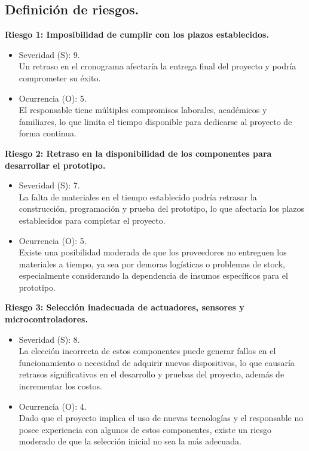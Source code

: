 \subsection{Definición de riesgos.}

\textbf{Riesgo 1: Imposibilidad de cumplir con los plazos establecidos.}
\begin{itemize}
	\item Severidad (S): 9.\\ Un retraso en el cronograma afectaría la entrega final del
	      proyecto y podría comprometer su éxito.
	\item Ocurrencia (O): 5.\\ El responsable tiene múltiples compromisos laborales,
	      académicos y familiares, lo que limita el tiempo disponible para dedicarse al
	      proyecto de forma continua.
\end{itemize}

\textbf{Riesgo 2: Retraso en la disponibilidad de los componentes para
	desarrollar el prototipo.}
\begin{itemize}
	\item Severidad (S): 7.\\ La falta de materiales en el tiempo establecido podría
	      retrasar la construcción, programación y prueba del prototipo, lo que afectaría
	      los plazos establecidos para completar el proyecto.
	\item Ocurrencia (O): 5.\\ Existe una posibilidad moderada de que los proveedores no
	      entreguen los materiales a tiempo, ya sea por demoras logísticas o problemas de
	      stock, especialmente considerando la dependencia de insumos específicos para el
	      prototipo.
\end{itemize}

\textbf{Riesgo 3: Selección inadecuada de actuadores, sensores y
	microcontroladores.}
\begin{itemize}
	\item Severidad (S): 8.\\ La elección incorrecta de estos componentes puede generar
	      fallos en el funcionamiento o necesidad de adquirir nuevos dispositivos, lo que
	      causaría retrasos significativos en el desarrollo y pruebas del proyecto,
	      además de incrementar los costos.
	\item Ocurrencia (O): 4.\\ Dado que el proyecto implica el uso de nuevas tecnologías
	      y el responsable no posee experiencia con algunos de estos componentes, existe
	      un riesgo moderado de que la selección inicial no sea la más adecuada.
\end{itemize}

